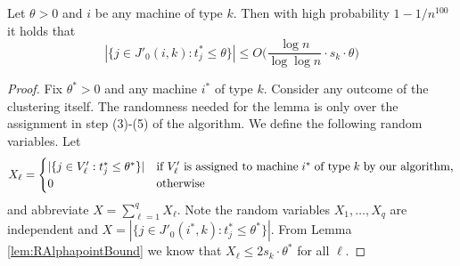   
  \begin{lemma}
  \label{lem:RVolumeBound}
  Let $\theta > 0$ and $i$ be any machine of type $k$. Then with high probability $1-1/n^{100}$ it holds that
  $$
  | \{ j \in J'_0(i,k) : t^*_j \leq   \theta \} | \leq O\Big(\frac{\log n}{\log \log n} \cdot s_k \cdot \theta\Big)
  $$
   \end{lemma}
  \begin{proof}
  Fix $\theta^* > 0$ and any machine $i^*$ of type $k$. 
  Consider any outcome of the clustering itself. 
  The randomness needed for the lemma is only over the assignment in step (3)-(5) of the algorithm. We define the following random variables. Let
  \[
  X_{\ell}= \begin{cases}  | \{ j \in V'_{\ell} : t^*_j \leq   \theta^* \} | &\textrm{if } V'_{\ell} \textrm{ is assigned to machine} \hspace{1mm} i^* \hspace{1mm}   \textrm{of type} \hspace{1mm} k \hspace{1mm} \textrm{by our algorithm,} 
  \\ 0 & \textrm{otherwise} 
  \end{cases}
  \]
  and abbreviate $X = \sum^{q}_{\ell = 1} X_\ell$. Note the random variables $X_{1},\ldots,X_q$ are independent and $X = | \{ j \in J'_0(i^*,k) : t^*_j \leq   \theta^* \} |$.
  From Lemma \ref{lem:RAlphapointBound} we know that $X_\ell \leq 2s_k \cdot \theta^*$ for all $\ell$.
  

\end{proof}
